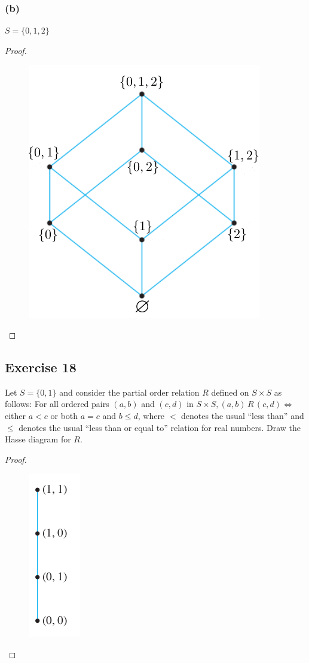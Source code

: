 \documentclass[14pt]{extarticle}
\begin{document}
\subsubsection{(b)}
\(S = \{0, 1, 2\}\)

\begin{proof}
\begin{figure}[ht!]
\centering
\includegraphics[scale=0.4]{../images/8.5.17.b.png}
\end{figure}
\end{proof}

\subsection{Exercise 18}
Let \(S = \{0, 1\}\) and consider the partial order relation $R$ defined on \(S \times S\) as follows: For all 
ordered pairs \((a, b)\) and \((c, d)\) in \(S \times S, (a, b) \,R\, (c, d) \iff\) either \(a <c\) or both \(a= c\) 
and \(b \leq d\), where \(<\) denotes the usual “less than” and \(\leq\) denotes the usual “less than or equal to” 
relation for real numbers. Draw the Hasse diagram for $R$.

\begin{proof}
\begin{figure}[ht!]
\centering
\includegraphics[scale=0.4]{../images/8.5.18.png}
\end{figure}
\end{proof}
\end{document}
